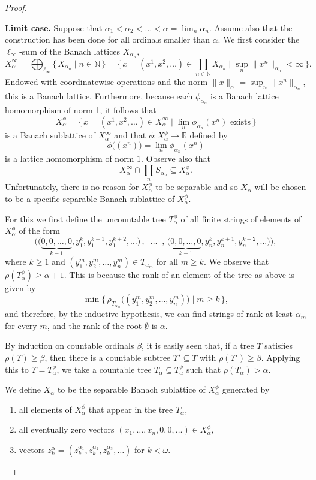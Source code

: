 \documentclass[10pt]{amsart}
\newcommand{\Mgd}[2]{\big\{\,  {#1}\;\big|\; {#2} \,\big\} }
\newcommand{\MGd}[2]{\Big\{ \, {#1}\;\Big|\; {#2} \,\Big\} }
\newcommand {\1}{\mathbb 1}
\newcommand {\N}{\mathbb N}
\newcommand {\R}{\mathbb R}
\theoremstyle{plain}
\theoremstyle{definition}
\begin{document}
\begin{proof}
	
	\
	
{\bf Limit case.} Suppose that $\alpha_1 <\alpha_2 < \ldots<\alpha = \lim_n \alpha_n$. Assume also that the construction has been done for all ordinals smaller than $\alpha$. We first consider the $\ell_\infty$-sum of the Banach lattices $X_{\alpha_n}$,
$$
X^\infty_\alpha 
= \bigoplus_{\ell_\infty}\MGd{X_{\alpha_n} }{ n\in \N} 
= \MGd{x=(x^1,x^2,\ldots)\in \prod_{n\in \N}X_{\alpha_n} }
{ \sup_n\|x^n\|_{\alpha_n}<\infty}.
$$
Endowed with coordinatewise operations and the norm $\|x\|_\alpha = \sup_n \|x^n\|_{\alpha_n}$, this is a Banach lattice. Furthermore, because each $\phi_{\alpha_n}$ is a Banach lattice homomorphism of norm 1, it follows that 
$$
X^\phi_\alpha =\MGd{x=(x^1,x^2,\ldots)\in X^\infty_\alpha }{ \lim_n \phi_{\alpha_n}(x^n) \text{ exists}}
$$ 
is a Banach sublattice of $X^\infty_\alpha$ and that $\phi\colon X^\phi_\alpha\to \R$ defined by
$$
\phi\big((x^n)\big)=\lim_n\phi_{\alpha_n}(x^n)
$$
is a lattice homomorphism of norm $1$. Observe also that $$X^\infty_\alpha\cap \prod_n S_{\alpha_n}\subseteq X^\phi_\alpha.
$$
Unfortunately, there is no reason for $X^\phi_\alpha$ to be separable and so $X_\alpha$ will be chosen to be a specific  separable Banach sublattice of $X^\phi_\alpha$. 


For this we first define the uncountable tree
$T^\phi_\alpha$ of all finite strings of elements of $X^\phi_\alpha$ of the form 
$$
\Big(
\big(\underbrace{0,0,\ldots,0}_{k-1},{y_1^k},{y_1^{k+1}},{y_1^{k+2}},\ldots\big)
\,,\;\; \ldots\;\; , \, 
\big(\underbrace{0,0,\ldots,0}_{k-1},{y_n^k},{y_n^{k+1}},{y_n^{k+2}},\ldots\big)
\Big),
$$
where $k\geqslant 1$ and $(y_1^m,y_2^m,\ldots, y_n^m)\in T_{\alpha_m}$ for all $m\geqslant k$. We observe that $\rho(T^\phi_\alpha)\geqslant \alpha+1.$ 
This is because the rank of an element of the tree as above is given by 
$$
\min\Mgd{\rho_{T_{\alpha_m}}\big((y_1^m,y_2^m,\ldots, y_n^m)\big) } { m\geqslant k},
$$ 
and therefore, by the inductive hypothesis, we can find strings of rank at least $\alpha_m$ for every $m$, and the rank of the root $\emptyset$ is $\alpha$. 

By induction on countable ordinals $\beta$, it is easily seen that, if a tree $\Upsilon$ satisfies $\rho(\Upsilon)\geqslant \beta$, then there is a countable subtree $\Upsilon'\subseteq \Upsilon$ with $\rho(\Upsilon')\geqslant \beta$. 
Applying this to $\Upsilon=T^\phi_\alpha$, we take a countable tree $T_\alpha\subseteq T^\phi_\alpha$ such that $\rho(T_\alpha)>\alpha$.

We define $X_\alpha$ to be the separable Banach sublattice of $X^\phi_\alpha$ generated by 
\begin{enumerate}
    \item all elements of $X^\phi_\alpha$ that appear in the tree $T_\alpha$, 
    \item all eventually zero vectors $(x_1,\ldots,x_n,0,0,\ldots)\in X^\phi_\alpha$,
    \item vectors $z^\alpha_k = \left({z^{\alpha_1}_k},{z^{\alpha_2}_k},{z^{\alpha_3}_k},\ldots\right)$ for  $k<\omega$.  
\end{enumerate}



\end{proof}
\end{document}
